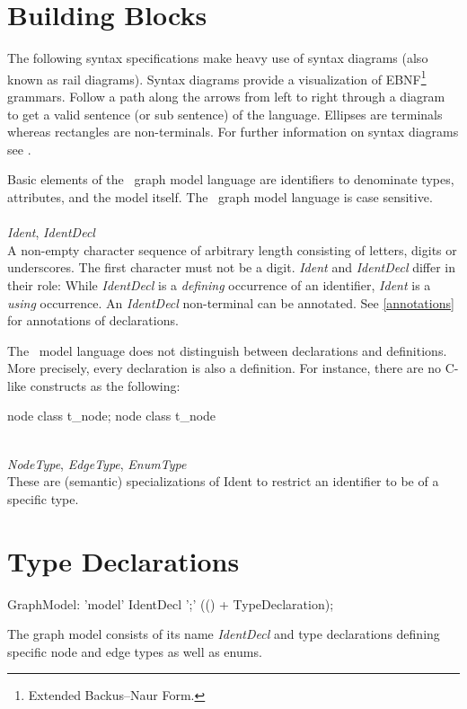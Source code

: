 \section{Building Blocks}
\label{modelbb}

\begin{note}
The following syntax specifications make heavy use of syntax diagrams (also known as rail diagrams). Syntax diagrams provide a visualization of EBNF\footnote{Extended Backus–Naur Form.} grammars. Follow a path along the arrows from left to right through a diagram to get a valid sentence (or sub sentence) of the language. Ellipses are terminals whereas rectangles are non-terminals. For further information on syntax diagrams see \cite{pascal}.
\end{note}
Basic elements of the \GrG\ graph model language are identifiers to denominate types, attributes, and the model itself. The \GrG\ graph model language is case sensitive.\\
\\
\emph{Ident}, \emph{IdentDecl}\\ \nopagebreak
A non-empty character sequence of arbitrary length consisting of letters, digits or underscores. The first character must not be a digit. \emph{Ident} and \emph{IdentDecl} differ in their role: While \emph{IdentDecl} is a \emph{defining} occurrence of an identifier, \emph{Ident} is a \emph{using} occurrence. An \emph{IdentDecl} non-terminal can be annotated. See \ref{annotations} for annotations of declarations.
\begin{note}
  The \GrG\ model language does not distinguish between declarations and definitions. More precisely, every declaration is also a definition. For instance, there are no C-like constructs as the following:
\begin{grgen}
node class t_node;
node class t_node {
}
\end{grgen}
\end{note}
\mbox{ }\\
\emph{NodeType}, \emph{EdgeType}, \emph{EnumType}\\ \nopagebreak
These are (semantic) specializations of Ident to restrict an identifier to be of a specific type.

\section{Type Declarations}
\begin{rail}
  GraphModel: 'model' IdentDecl ';' (() + TypeDeclaration);
\end{rail}
The graph model consists of its name \emph{IdentDecl} and type declarations defining specific node and edge types as well as enums.

